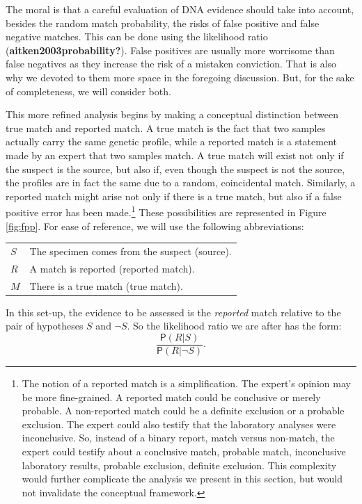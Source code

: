 \documentclass[
  letterpaper,
  DIV=11,
  numbers=noendperiod]{scrartcl}
\newcommand{\pr}[1]{\mathsf{P}(#1)}
\begin{document}
The moral is that a careful evaluation of DNA evidence should take into
account, besides the random match probability, the risks of false
positive and false negative matches. This can be done using the
likelihood ratio (\textbf{aitken2003probability?}). False positives are
usually more worrisome than false negatives as they increase the risk of
a mistaken conviction. That is also why we devoted to them more space in
the foregoing discussion. But, for the sake of completeness, we will
consider both.

This more refined analysis begins by making a conceptual distinction
between true match and reported match. A true match is the fact that two
samples actually carry the same genetic profile, while a reported match
is a statement made by an expert that two samples match. A true match
will exist not only if the suspect is the source, but also if, even
though the suspect is not the source, the profiles are in fact the same
due to a random, coincidental match. Similarly, a reported match might
arise not only if there is a true match, but also if a false positive
error has been made.\footnote{The notion of a reported match is a
  simplification. The expert's opinion may be more fine-grained. A
  reported match could be conclusive or merely probable. A non-reported
  match could be a definite exclusion or a probable exclusion. The
  expert could also testify that the laboratory analyses were
  inconclusive. So, instead of a binary report, match versus non-match,
  the expert could testify about a conclusive match, probable match,
  inconclusive laboratory results, probable exclusion, definite
  exclusion. This complexity would further complicate the analysis we
  present in this section, but would not invalidate the conceptual
  framework.} These possibilities are represented in Figure
\ref{fig:fpp}. For ease of reference, we will use the following
abbreviations:

\begin{center} \hspace{10mm}
\begin{tabular}{lp{9cm}}
$S$ & The specimen comes from the suspect (source). \\
$R$ & A match is reported (reported match). \\
$M$ & There is a true match (true match).
\end{tabular}
\end{center}

\noindent  In this set-up, the evidence to be assessed is the
\textit{reported} match relative to the pair of hypotheses \(S\) and
\(\neg S\). So the likelihood ratio we are after has the form: \[ 
\frac{\pr{R \vert S}}{\pr{R \vert \neg S}}.
\]
\end{document}
